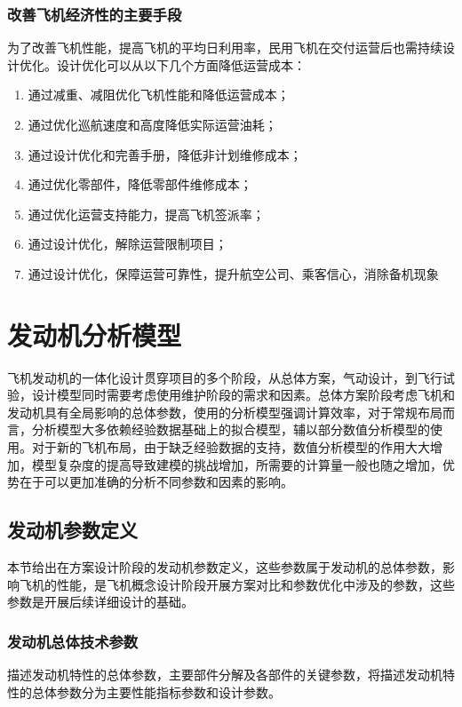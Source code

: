 \documentclass[12pt,a4paper]{report}
\begin{document}
\subsubsection{改善飞机经济性的主要手段}
为了改善飞机性能，提高飞机的平均日利用率，民用飞机在交付运营后也需持续设计优化。设计优化可以从以下几个方面降低运营成本：

\begin{enumerate}
\item 通过减重、减阻优化飞机性能和降低运营成本；
\item 通过优化巡航速度和高度降低实际运营油耗；
\item 通过设计优化和完善手册，降低非计划维修成本；
\item 通过优化零部件，降低零部件维修成本；
\item 通过优化运营支持能力，提高飞机签派率；
\item 通过设计优化，解除运营限制项目；
\item 通过设计优化，保障运营可靠性，提升航空公司、乘客信心，消除备机现象
\end{enumerate}

\section{发动机分析模型}

飞机发动机的一体化设计贯穿项目的多个阶段，从总体方案，气动设计，到飞行试验，设计模型同时需要考虑使用维护阶段的需求和因素。总体方案阶段考虑飞机和发动机具有全局影响的总体参数，使用的分析模型强调计算效率，对于常规布局而言，分析模型大多依赖经验数据基础上的拟合模型，辅以部分数值分析模型的使用。对于新的飞机布局，由于缺乏经验数据的支持，数值分析模型的作用大大增加，模型复杂度的提高导致建模的挑战增加，所需要的计算量一般也随之增加，优势在于可以更加准确的分析不同参数和因素的影响。

\subsection{发动机参数定义}

本节给出在方案设计阶段的发动机参数定义，这些参数属于发动机的总体参数，影响飞机的性能，是飞机概念设计阶段开展方案对比和参数优化中涉及的参数，这些参数是开展后续详细设计的基础。


\subsubsection{发动机总体技术参数}

描述发动机特性的总体参数，主要部件分解及各部件的关键参数，将描述发动机特性的总体参数分为主要性能指标参数和设计参数。
\end{document}
